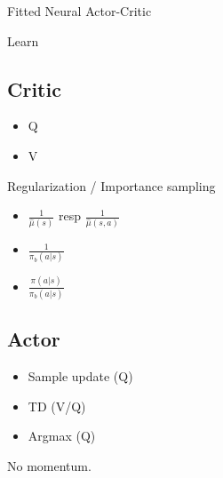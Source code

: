 Fitted Neural Actor-Critic

Learn
\subsection{Critic}
\begin{itemize}
 \item Q
 \item V
\end{itemize}

Regularization / Importance sampling
\begin{itemize}
 \item $\frac{1}{\hat{\mu}(s)}$ resp $\frac{1}{\hat{\mu}(s,a)}$
 \item $\frac{1}{\pi_b(a|s)}$
 \item $\frac{\pi(a|s)}{\pi_b(a|s)}$
\end{itemize}


\subsection{Actor}

\begin{itemize}
 \item Sample update (Q)
 \item TD (V/Q)
 \item Argmax (Q)
\end{itemize}

No momentum.